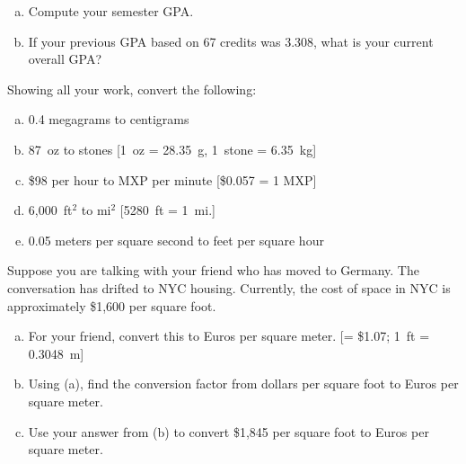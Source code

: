 \documentclass[11pt,letterpaper]{article}
\begin{document}
\begin{enumerate}[(a)]
\item Compute your semester GPA. 
\item If your previous GPA based on 67 credits was 3.308, what is your current overall GPA?
\end{enumerate}



\newpage



 Showing all your work, convert the following:
	\begin{enumerate}[(a)]
	\item 0.4 megagrams to centigrams
	\item 87~oz to stones [1~oz = 28.35~g, 1~stone = 6.35~kg]
	\item \$98 per hour to MXP per minute [\$0.057 = 1 MXP]
	\item 6,000~ft$^2$ to mi$^2$ [5280~ft = 1~mi.]
	\item 0.05 meters per square second to feet per square hour
	\end{enumerate}



\newpage



 Suppose you are talking with your friend who has moved to Germany. The conversation has drifted to NYC housing. Currently, the cost of space in NYC is approximately \$1,600 per square foot. 
	\begin{enumerate}[(a)]
	\item For your friend, convert this to Euros per square meter. [= \$1.07; 1~ft = 0.3048~m]
	\item Using (a), find the conversion factor from dollars per square foot to Euros per square meter. 
	\item Use your answer from (b) to convert \$1,845 per square foot to Euros per square meter. 
	\end{enumerate}
\end{document}
